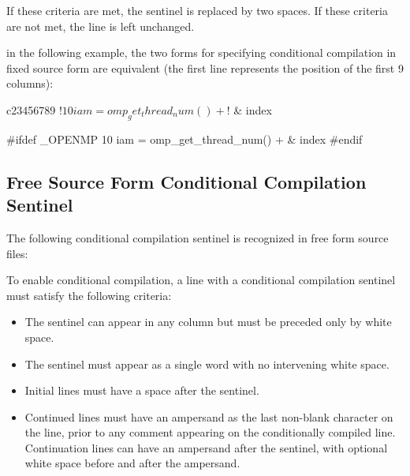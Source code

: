 \begin{fortranspecific}
If these criteria are met, the sentinel is replaced by two spaces. If these criteria are not
met, the line is left unchanged.

\begin{note}
in the following example, the two forms for specifying conditional compilation
in fixed source form are equivalent (the first line represents the position of the first 9
columns):

\begin{ompfPragma}
c23456789
!$ 10 iam = omp_get_thread_num() +
!$   &          index

#ifdef _OPENMP
   10 iam = omp_get_thread_num() +
     &            index
#endif
\end{ompfPragma}
\end{note}





\subsection{Free Source Form Conditional Compilation Sentinel}
\label{subsec:Free Source Form Conditional Compilation Sentinel}
The following conditional compilation sentinel is recognized in free form source files:

\begin{ompfPragma}
!$
\end{ompfPragma}

To enable conditional compilation, a line with a conditional compilation sentinel must
satisfy the following criteria:

\begin{itemize}
\item The sentinel can appear in any column but must be preceded only by white space.

\item The sentinel must appear as a single word with no intervening white space.

\item Initial lines must have a space after the sentinel.

\item Continued lines must have an ampersand as the last non-blank character on the line,
prior to any comment appearing on the conditionally compiled line. Continuation lines
can have an ampersand after the sentinel, with optional white space before and after
the ampersand.
\end{itemize}


\end{fortranspecific}
